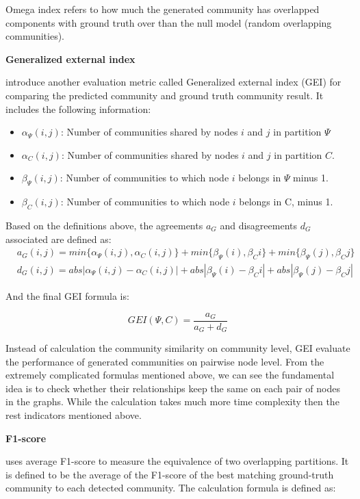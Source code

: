 Omega index refers to how much the generated community has overlapped components with ground truth over than the null model (random overlapping communities). 

\textbf{Generalized external index}

\cite{campello2007fuzzy,campello2010generalized} introduce another evaluation metric called Generalized external index (GEI) for comparing the predicted community and ground truth community result. It includes the following information:
\begin{itemize}
	\item  $\alpha_{\Psi}(i,j)$: Number of communities shared by nodes $i$ and $j$ in partition $\Psi$	
	\item   $\alpha_{C}(i,j)$: Number of communities shared by nodes $i$ and $j$ in partition $C$.
	\item  $\beta_{\Psi}(i,j)$: Number of communities to which node $i$ belongs in $\Psi$ minus 1.
	\item $\beta_{C}(i,j)$: Number of communities to which node $i$ belongs in C, minus 1.
\end{itemize}

Based on the definitions above, the agreements $a_{G}$ and disagreements $d_{G}$ associated  are defined as: 
$$
\begin{aligned}
&a_{G}(i,j) =min \{\alpha_{\Psi}(i,j),\alpha_{C}(i,j)\} + min \{\beta_{\Psi}(i),\beta_{C}{i}\}+ min \{\beta_{\Psi}(j),\beta_{C}{j}\} \\
&d_{G}(i,j) =abs |\alpha_{\Psi}(i,j)-\alpha_{C}(i,j)| + abs|\beta_{\Psi}(i)-\beta_{C}{i}|+ abs|\beta_{\Psi}(j)-\beta_{C}{j}|
\end{aligned} 
$$ 

And the final GEI formula is:

$$GEI(\Psi,C)=\frac{a_{G}}{a_{G}+d_{G}}$$

Instead of calculation the community similarity on community level, GEI evaluate the performance of generated communities on pairwise node level. From the extremely complicated formulas mentioned above, we can see the fundamental idea is to check whether their relationships keep the same on each pair of nodes in the graphs. While the calculation takes much more time complexity then the rest indicators mentioned above.

\textbf{F1-score}

\cite{yang2013overlapping} uses average F1-score to measure the equivalence of two overlapping partitions. It is defined to be the average of the F1-score of the best matching ground-truth community to each detected community. The calculation formula is defined as:

